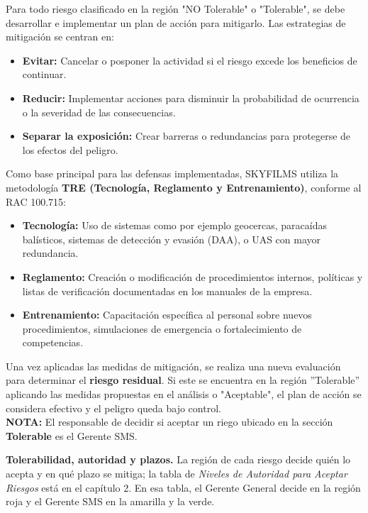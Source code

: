 Para todo riesgo clasificado en la región "NO Tolerable" o "Tolerable", se debe desarrollar e implementar un plan de acción para mitigarlo. Las estrategias de mitigación se centran en:

\begin{itemize}
    \item \textbf{Evitar:} Cancelar o posponer la actividad si el riesgo excede los beneficios de continuar.
    \item \textbf{Reducir:} Implementar acciones para disminuir la probabilidad de ocurrencia o la severidad de las consecuencias.
    \item \textbf{Separar la exposición:} Crear barreras o redundancias para protegerse de los efectos del peligro.
\end{itemize}

Como base principal para las defensas implementadas, SKYFILMS utiliza la metodología \textbf{TRE (Tecnología, Reglamento y Entrenamiento)}, conforme al RAC 100.715:

\begin{itemize}
    \item \textbf{Tecnología:} Uso de sistemas como por ejemplo geocercas, paracaídas balísticos, sistemas de detección y evasión (DAA), o UAS con mayor redundancia.
    \item \textbf{Reglamento:} Creación o modificación de procedimientos internos, políticas y listas de verificación documentadas en los manuales de la empresa.
    \item \textbf{Entrenamiento:} Capacitación específica al personal sobre nuevos procedimientos, simulaciones de emergencia o fortalecimiento de competencias.
\end{itemize}

Una vez aplicadas las medidas de mitigación, se realiza una nueva evaluación para determinar el \textbf{riesgo residual}. Si este se encuentra en la región ”Tolerable” aplicando las medidas propuestas en el análisis o "Aceptable", el plan de acción se considera efectivo y el peligro queda bajo control.\\

\textbf{NOTA:} El responsable de decidir si aceptar un riego ubicado en la sección \textbf{Tolerable} es el Gerente SMS.

\textbf{Tolerabilidad, autoridad y plazos.} La región de cada riesgo decide quién lo acepta y en qué plazo se mitiga; la tabla de \textit{Niveles de Autoridad para Aceptar Riesgos} está en el capítulo 2. En esa tabla, el Gerente General decide en la región roja y el Gerente SMS en la amarilla y la verde.

